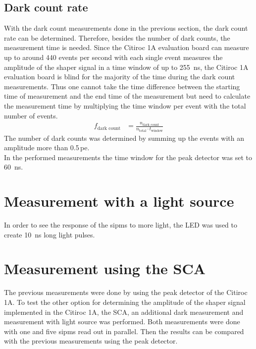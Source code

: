 \subsection{Dark count rate}
With the dark count measurements done in the previous section, the dark count rate can be determined. Therefore, besides the number of dark counts, the measurement time is needed. Since the Citiroc 1A evaluation board can measure up to around 440 events per second with each single event measures the amplitude of the shaper signal in a time window of up to \SI{255}{ns}, the Citiroc 1A evaluation board is blind for the majority of the time during the dark count measurements. Thus one cannot take the time difference between the starting time of measurement and the end time of the measurement but need to calculate the measurement time by multiplying the time window per event with the total number of events.
\begin{align}
    f_\text{dark count} &= \frac{n_\text{dark count}}{n_\text{total}\cdot t_\text{window}}
\end{align}
The number of dark counts was determined by summing up the events with an amplitude more than 0.5\,pe.\\
In the performed measurements the time window for the peak detector was set to \SI{60}{\nano\second}. 




\section{Measurement with a light source}
In order to see the response of the \ac{sipm}s to more light, the LED was used to create \SI{10}{\nano\second} long light pulses.





\section{Measurement using the SCA}
The previous measurements were done by using the peak detector of the Citiroc 1A. To test the other option for determining the amplitude of the shaper signal implemented in the Citiroc 1A, the SCA, an additional dark measurement and measurement with light source was performed. Both measurements were done with one and five \ac{sipm}s read out in parallel. Then the results can be compared with the previous measurements using the peak detector.\\
